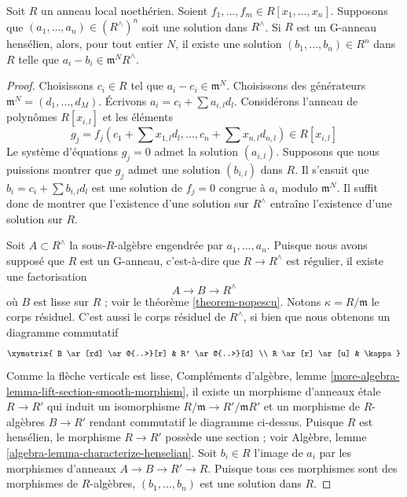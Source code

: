 \begin{theorem}
\label{theorem-approximation-property}
Soit $R$ un anneau local noethérien. Soient
$f_1, \ldots, f_m \in R[x_1, \ldots, x_n]$.
Supposons que $(a_1, \ldots, a_n) \in (R^\wedge)^n$ soit une solution
dans $R^\wedge$. Si $R$ est un G-anneau hensélien, alors, pour tout entier
$N$, il existe une solution $(b_1, \ldots, b_n) \in R^n$ dans $R$ telle que
$a_i - b_i \in \mathfrak m^NR^\wedge$.
\end{theorem}

\begin{proof}
Choisissons $c_i \in R$ tel que $a_i - c_i \in \mathfrak m^N$.
Choisissons des générateurs $\mathfrak m^N = (d_1, \ldots, d_M)$.
Écrivons $a_i = c_i + \sum a_{i, l} d_l$.
Considérons l'anneau de polynômes $R[x_{i, l}]$ et les éléments
$$
g_j = f_j(c_1 + \sum x_{1, l} d_l , \ldots, c_n + \sum x_{n, l} d_{n, l})
\in R[x_{i, l}]
$$
Le système d'équations $g_j = 0$ admet la solution $(a_{i, l})$.
Supposons que nous puissions montrer que $g_j$ admet une solution
$(b_{i, l})$ dans $R$.
Il s'ensuit que $b_i = c_i + \sum b_{i, l}d_l$ est une solution
de $f_j = 0$ congrue à $a_i$ modulo $\mathfrak m^N$.
Il suffit donc de montrer que l'existence d'une solution sur $R^\wedge$
entraîne l'existence d'une solution sur $R$.

\medskip\noindent
Soit $A \subset R^\wedge$ la sous-$R$-algèbre engendrée par
$a_1, \ldots, a_n$. Puisque nous avons supposé que $R$ est un G-anneau,
c'est-à-dire que $R \to R^\wedge$ est régulier, il existe une factorisation
$$
A \to B \to R^\wedge
$$
où $B$ est lisse sur $R$ ; voir le théorème \ref{theorem-popescu}.
Notons $\kappa = R/\mathfrak m$ le corps résiduel. C'est aussi
le corps résiduel de $R^\wedge$, si bien que nous obtenons un diagramme
commutatif
$$
\xymatrix{
B \ar[rd] \ar@{..>}[r] & R' \ar@{..>}[d] \\
R \ar[r] \ar[u] & \kappa
}
$$
Comme la flèche verticale est lisse,
Compléments d'algèbre, lemme
\ref{more-algebra-lemma-lift-section-smooth-morphism},
il existe un morphisme d'anneaux \'etale $R \to R'$ qui induit un isomorphisme
$R/\mathfrak m \to R'/\mathfrak mR'$ et un morphisme de $R$-algèbres
$B \to R'$ rendant commutatif le diagramme ci-dessus.
Puisque $R$ est hensélien, le morphisme $R \to R'$ possède une section ; voir
Algèbre, lemme \ref{algebra-lemma-characterize-henselian}.
Soit $b_i \in R$ l'image de $a_i$ par les morphismes d'anneaux
$A \to B \to R' \to R$. Puisque tous ces morphismes sont des morphismes de
$R$-algèbres, $(b_1, \ldots, b_n)$ est une solution dans $R$.
\end{proof}

